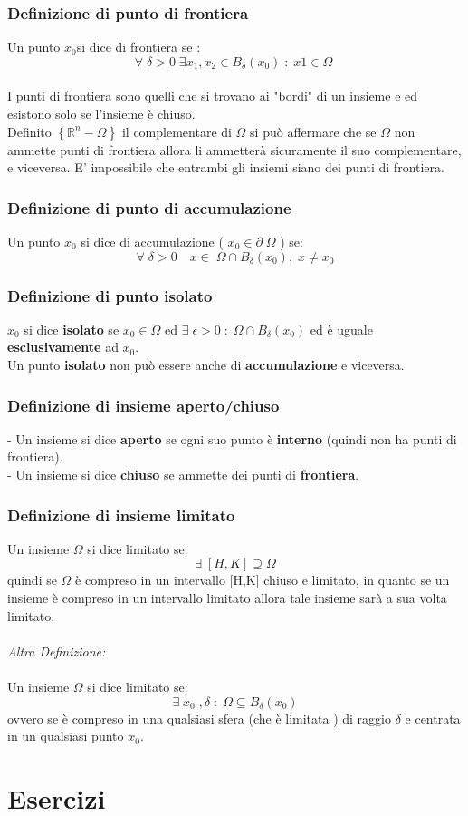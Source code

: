 \documentclass[fontsize = 20px, paper = a4]{article}
\begin{document}
\subsubsection{Definizione di punto di frontiera}
Un punto $x_0$si dice di frontiera se :
$$\forall \; \delta >0 \; \exists x_1,x_2 \in B_\delta(x_0) \; : \; x1 \in \Omega \; $$ \\
I punti di frontiera sono quelli che si trovano ai "bordi" di un insieme e ed esistono solo se l'insieme è chiuso. \\
Definito $\left \{ \mathbb{R}^n - \Omega \right \}$ il complementare di $\Omega$ si può affermare che se $\Omega$ non ammette punti di frontiera allora li ammetterà sicuramente il suo complementare, e viceversa. E' impossibile che entrambi gli insiemi siano dei punti di frontiera.
\subsubsection{Definizione di punto di accumulazione}
Un punto $x_0$ si dice di accumulazione ( $x_0 \in \partial \; \Omega$ ) se:
$$\forall \; \delta > 0 \quad x \in \; \Omega \cap B_\delta \left(x_0 \right), \; x \neq x_0$$
\subsubsection{Definizione di punto isolato}
$x_0$ si dice \textbf{isolato} se $x_0 \in \Omega$ ed $\exists \; \epsilon > 0 \; : \; \Omega \cap B_\delta(x_0)$ ed è uguale \textbf{esclusivamente} ad $x_0$. \\
Un punto \textbf{isolato} non può essere anche di \textbf{accumulazione} e viceversa.
\subsubsection{Definizione di insieme aperto/chiuso}
- Un insieme si dice \textbf{aperto} se ogni suo punto è \textbf{interno} (quindi non ha punti di frontiera). \\
- Un insieme si dice \textbf{chiuso} se ammette dei punti di \textbf{frontiera}.
\subsubsection{Definizione di insieme limitato}
Un insieme $\Omega$ si dice limitato se:
$$\exists \; [H,K] \supseteq \Omega$$
quindi se $\Omega$ è compreso in un intervallo [H,K] chiuso e limitato, in quanto se un insieme è compreso in un intervallo limitato allora tale insieme sarà a sua volta limitato.\\\\
\emph{Altra Definizione:}\\ \\
Un insieme $\Omega$ si dice limitato se:
$$\exists \; x_0 \; , \delta \; : \; \Omega \subseteq B_\delta(x_0)$$
ovvero se è compreso in una qualsiasi sfera (che è limitata ) di raggio $\delta$ e centrata in un qualsiasi punto $x_0$.

\section{Esercizi}
\end{document}
